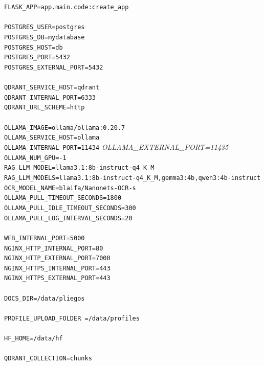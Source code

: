 \begin{tcolorbox}[
	colback=yellow!8,
	colframe=orange!60!black,
	title=.env,
	fonttitle=\bfseries,
	breakable
]
	{\footnotesize
		\noindent
		\texttt{FLASK\_APP=app.main.code:create\_app}\\
		\\
		\texttt{POSTGRES\_USER=postgres}\\
		\texttt{POSTGRES\_DB=mydatabase}\\
		\texttt{POSTGRES\_HOST=db}\\
		\texttt{POSTGRES\_PORT=5432}\\
		\texttt{POSTGRES\_EXTERNAL\_PORT=5432}\\
		\\
		\texttt{QDRANT\_SERVICE\_HOST=qdrant}\\
		\texttt{QDRANT\_INTERNAL\_PORT=6333}\\
		\texttt{QDRANT\_URL\_SCHEME=http}\\
		\\
		\texttt{OLLAMA\_IMAGE=ollama/ollama:0.20.7}\\
		\texttt{OLLAMA\_SERVICE\_HOST=ollama}\\
		\texttt{OLLAMA\_INTERNAL\_PORT=11434}
		\textit{OLLAMA\_EXTERNAL\_PORT=11435}\\
		\texttt{OLLAMA\_NUM\_GPU=-1}\\
		\texttt{RAG\_LLM\_MODEL=llama3.1:8b-instruct-q4\_K\_M}\\
		\texttt{RAG\_LLM\_MODELS=llama3.1:8b-instruct-q4\_K\_M,gemma3:4b,qwen3:4b-instruct}\\
		\texttt{OCR\_MODEL\_NAME=blaifa/Nanonets-OCR-s}\\
		\texttt{OLLAMA\_PULL\_TIMEOUT\_SECONDS=1800}\\
		\texttt{OLLAMA\_PULL\_IDLE\_TIMEOUT\_SECONDS=300}\\
		\texttt{OLLAMA\_PULL\_LOG\_INTERVAL\_SECONDS=20}\\
		\\
		\texttt{WEB\_INTERNAL\_PORT=5000}\\
		\texttt{NGINX\_HTTP\_INTERNAL\_PORT=80}\\
		\texttt{NGINX\_HTTP\_EXTERNAL\_PORT=7000}\\
		\texttt{NGINX\_HTTPS\_INTERNAL\_PORT=443}\\
		\texttt{NGINX\_HTTPS\_EXTERNAL\_PORT=443}\\
		\\
		\texttt{DOCS\_DIR=/data/pliegos}\\
		\\
		\texttt{PROFILE\_UPLOAD\_FOLDER =/data/profiles}\\
		\\
		\texttt{HF\_HOME=/data/hf}\\
		\\
		\texttt{QDRANT\_COLLECTION=chunks}
	}
\end{tcolorbox}

